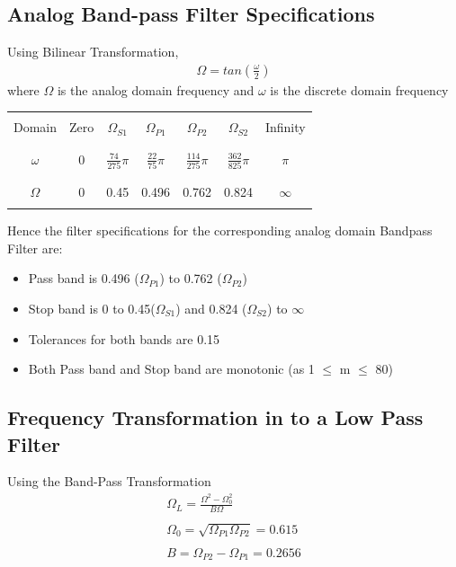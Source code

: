 \documentclass[12pt]{article}
\begin{document}
	\color{cyan}
	\subsection{Analog Band-pass Filter Specifications}
	\color{black}
	Using Bilinear Transformation,
	\begin{gather*}
		\Omega = tan\left(\frac{\omega}{2}\right)
	\end{gather*}
	where $\Omega$ is the analog domain frequency and $\omega$ is the discrete domain frequency\\
	
	\begin{center}
	\begin{tabular}{ |c|c|c|c|c|c|c| }
		\hline
		&&&&&&\\
		Domain& Zero & $\Omega_{S1}$ & $\Omega_{P1}$ &$\Omega_{P2}$& $\Omega_{S2}$&Infinity\\
		&&&&&&\\
		\hline
		&&&&&&\\
		$\omega$ & 0 & $\frac{74}{275}\pi$ & $\frac{22}{75}\pi$& $\frac{114}{275}\pi$& $\frac{362}{825}\pi$& $\pi$\\
		&&&&&&\\
		\hline
		&&&&&&\\
		$\Omega$ & 0 & 0.45 & 0.496 & 0.762& 0.824 & $\infty$\\
		&&&&&&\\
		\hline
	\end{tabular}
	\end{center}
	
	\noindent Hence the filter specifications for the corresponding analog domain Bandpass Filter are:
	\begin{itemize}
		\item Pass band is 0.496 ($\Omega_{P1}$)  to 0.762 ($\Omega_{P2}$) 
		\item Stop band is 0 to 0.45($\Omega_{S1}$) and 0.824 ($\Omega_{S2}$) to $\infty$
		\item Tolerances for both bands are 0.15
		\item Both Pass band and Stop band are monotonic (as 1 $\le$ m $\le$ 80)
	\end{itemize}
	
	\color{cyan}
	\subsection{Frequency Transformation in to a Low Pass Filter}
	\color{black}
	Using the Band-Pass Transformation
	\begin{gather*}
		\Omega_L = \frac{\Omega^2 - \Omega_0^2}{B\Omega}\\\\
		\Omega_0 = \sqrt{\Omega_{P1} \Omega_{P2}} = 0.615\\\\
		B = \Omega_{P2} - \Omega_{P1} = 0.2656
	\end{gather*}
\end{document}
